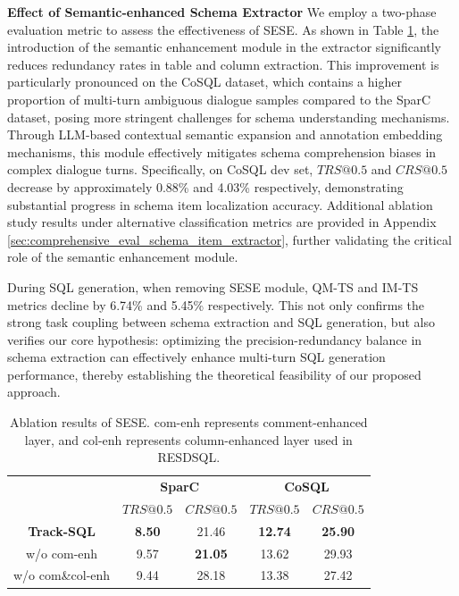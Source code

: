 \documentclass[11pt]{article}
\begin{document}
\vspace{4pt}
\noindent\textbf{Effect of Semantic-enhanced Schema Extractor} We employ a two-phase evaluation metric to assess the effectiveness of SESE. As shown in Table \ref{tab:ablation_result_schema_extractor}, the introduction of the semantic enhancement module in the extractor significantly reduces redundancy rates in table and column extraction. This improvement is particularly pronounced on the CoSQL dataset, which contains a higher proportion of multi-turn ambiguous dialogue samples compared to the SparC dataset, posing more stringent challenges for schema understanding mechanisms. Through LLM-based contextual semantic expansion and annotation embedding mechanisms, this module effectively mitigates schema comprehension biases in complex dialogue turns. Specifically, on CoSQL dev set, $TRS@0.5$ and $CRS@0.5$ decrease by approximately 0.88\% and 4.03\% respectively, demonstrating substantial progress in schema item localization accuracy. Additional ablation study results under alternative classification metrics are provided in Appendix \ref{sec:comprehensive_eval_schema_item_extractor}, further validating the critical role of the semantic enhancement module.

During SQL generation, when removing SESE module, QM-TS and IM-TS metrics decline by 6.74\% and 5.45\% respectively. This not only confirms the strong task coupling between schema extraction and SQL generation, but also verifies our core hypothesis: optimizing the precision-redundancy balance in schema extraction can effectively enhance multi-turn SQL generation performance, thereby establishing the theoretical feasibility of our proposed approach.

\begin{table}[]
    \centering
    \large
    \renewcommand\arraystretch{1.3}
    \resizebox{\linewidth}{!} {
        \begin{tabular}{c|cc|cc}
            \toprule %
             & \multicolumn{2}{c|}{\textbf{SparC}} & \multicolumn{2}{c}{\textbf{CoSQL}} \\
             & $TRS@0.5$ & $CRS@0.5$ & $TRS@0.5$ & $CRS@0.5$ \\
             \midrule
             \textbf{Track-SQL} & \textbf{8.50} & 21.46 & \textbf{12.74} & \textbf{25.90} \\
             w/o com-enh & 9.57 & \textbf{21.05} & 13.62 & 29.93 \\
             w/o com\&col-enh & 9.44 & 28.18 & 13.38 & 27.42 \\
             \bottomrule
        \end{tabular}
    }
    \caption{Ablation results of SESE. com-enh represents comment-enhanced layer, and col-enh represents column-enhanced layer used in RESDSQL.}
    \label{tab:ablation_result_schema_extractor}
\end{table}
\end{document}
